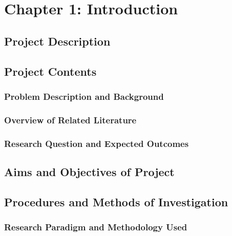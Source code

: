 
\chapter{Chapter 1: Introduction} %

\label{Chapter1} %


\newcommand{\keyword}[1]{\textbf{#1}}
\newcommand{\tabhead}[1]{\textbf{#1}}
\newcommand{\code}[1]{\texttt{#1}}
\newcommand{\file}[1]{\texttt{\bfseries#1}}
\newcommand{\option}[1]{\texttt{\itshape#1}}


\section{Project Description}

\section{Project Contents}
\subsection{Problem Description and Background}
\subsection{Overview of Related Literature}
\subsection{Research Question and Expected Outcomes}

\section{Aims and Objectives of Project}

\section{Procedures and Methods of Investigation}
\subsection{Research Paradigm and Methodology Used}
